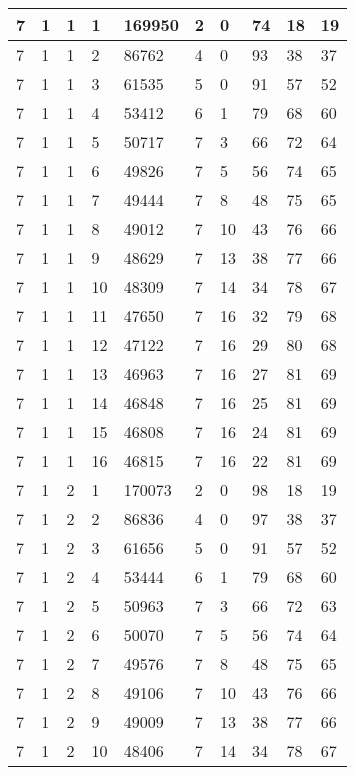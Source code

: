 \begin{table}[!ht]
\begin{tabular}{|l|l|l|l|l|l|l|l|l|l|}
        7 & 1 & 1 & 1 & 169950 & 2 & 0 & 74 & 18 & 19 \\ \hline
        7 & 1 & 1 & 2 & 86762 & 4 & 0 & 93 & 38 & 37 \\ \hline
        7 & 1 & 1 & 3 & 61535 & 5 & 0 & 91 & 57 & 52 \\ \hline
        7 & 1 & 1 & 4 & 53412 & 6 & 1 & 79 & 68 & 60 \\ \hline
        7 & 1 & 1 & 5 & 50717 & 7 & 3 & 66 & 72 & 64 \\ \hline
        7 & 1 & 1 & 6 & 49826 & 7 & 5 & 56 & 74 & 65 \\ \hline
        7 & 1 & 1 & 7 & 49444 & 7 & 8 & 48 & 75 & 65 \\ \hline
        7 & 1 & 1 & 8 & 49012 & 7 & 10 & 43 & 76 & 66 \\ \hline
        7 & 1 & 1 & 9 & 48629 & 7 & 13 & 38 & 77 & 66 \\ \hline
        7 & 1 & 1 & 10 & 48309 & 7 & 14 & 34 & 78 & 67 \\ \hline
        7 & 1 & 1 & 11 & 47650 & 7 & 16 & 32 & 79 & 68 \\ \hline
        7 & 1 & 1 & 12 & 47122 & 7 & 16 & 29 & 80 & 68 \\ \hline
        7 & 1 & 1 & 13 & 46963 & 7 & 16 & 27 & 81 & 69 \\ \hline
        7 & 1 & 1 & 14 & 46848 & 7 & 16 & 25 & 81 & 69 \\ \hline
        7 & 1 & 1 & 15 & 46808 & 7 & 16 & 24 & 81 & 69 \\ \hline
        7 & 1 & 1 & 16 & 46815 & 7 & 16 & 22 & 81 & 69 \\ \hline
        7 & 1 & 2 & 1 & 170073 & 2 & 0 & 98 & 18 & 19 \\ \hline
        7 & 1 & 2 & 2 & 86836 & 4 & 0 & 97 & 38 & 37 \\ \hline
        7 & 1 & 2 & 3 & 61656 & 5 & 0 & 91 & 57 & 52 \\ \hline
        7 & 1 & 2 & 4 & 53444 & 6 & 1 & 79 & 68 & 60 \\ \hline
        7 & 1 & 2 & 5 & 50963 & 7 & 3 & 66 & 72 & 63 \\ \hline
        7 & 1 & 2 & 6 & 50070 & 7 & 5 & 56 & 74 & 64 \\ \hline
        7 & 1 & 2 & 7 & 49576 & 7 & 8 & 48 & 75 & 65 \\ \hline
        7 & 1 & 2 & 8 & 49106 & 7 & 10 & 43 & 76 & 66 \\ \hline
        7 & 1 & 2 & 9 & 49009 & 7 & 13 & 38 & 77 & 66 \\ \hline
        7 & 1 & 2 & 10 & 48406 & 7 & 14 & 34 & 78 & 67 \\ \hline

\end{tabular}
\end{table}
